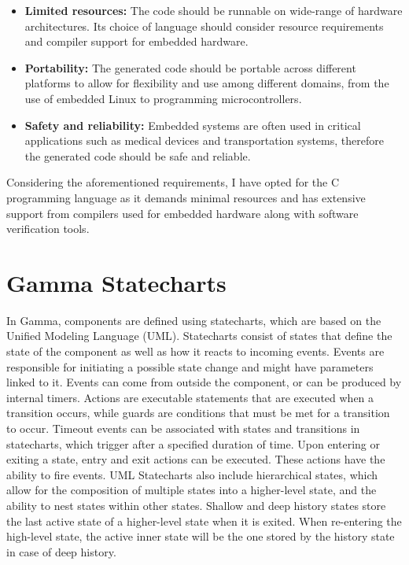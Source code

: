 \begin{itemize}
	\item \textbf{Limited resources:} The code should be runnable on wide-range of hardware architectures. Its choice of language should consider resource requirements and compiler support for embedded hardware.
	
	\item \textbf{Portability:} The generated code should be portable across different platforms to allow for flexibility and use among different domains, from the use of embedded Linux to programming microcontrollers.
	
	\item \textbf{Safety and reliability:} Embedded systems are often used in critical applications such as medical devices and transportation systems, therefore the generated code should be safe and reliable.
\end{itemize}

Considering the aforementioned requirements, I have opted for the C programming language as it demands minimal resources and has extensive support from compilers used for embedded hardware along with software verification tools.

\section{Gamma Statecharts}

In Gamma, components are defined using statecharts, which are based on the Unified Modeling Language (UML). Statecharts consist of states that define the state of the component as well as how it reacts to incoming events. Events are responsible for initiating a possible state change and might have parameters linked to it. Events can come from outside the component, or can be produced by internal timers. Actions are executable statements that are executed when a transition occurs, while guards are conditions that must be met for a transition to occur. Timeout events can be associated with states and transitions in statecharts, which trigger after a specified duration of time. Upon entering or exiting a state, entry and exit actions can be executed. These actions have the ability to fire events. UML Statecharts also include hierarchical states, which allow for the composition of multiple states into a higher-level state, and the ability to nest states within other states. Shallow and deep history states store the last active state of a higher-level state when it is exited. When re-entering the high-level state, the active inner state will be the one stored by the history state in case of deep history.

